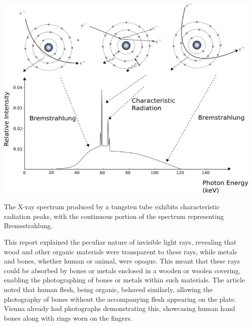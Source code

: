 \documentclass[a4paper,12pt]{report}
\begin{document}
\begin{center}
  \includegraphics[scale = 0.5]{xraytungsten.jpg}
  \label{xraytungsten}
\end{center}

The X-ray spectrum produced by a tungsten tube exhibits characteristic radiation peaks, with the
continuous portion of the spectrum representing Bremsstrahlung.

This report  explained the peculiar nature of invisible light rays, revealing that wood and other
organic materials were transparent to these rays, while metals and bones, whether human or
animal, were opaque. This meant that these rays could be absorbed by bones or metals enclosed
in a wooden or woolen covering, enabling the photographing of bones or metals within such
materials. The article noted that human flesh, being organic, behaved similarly, allowing the
photography of bones without the accompanying flesh appearing on the plate. Vienna already had
photographs demonstrating this, showcasing human hand bones along with rings worn on the
fingers.

\newpage
\end{document}
